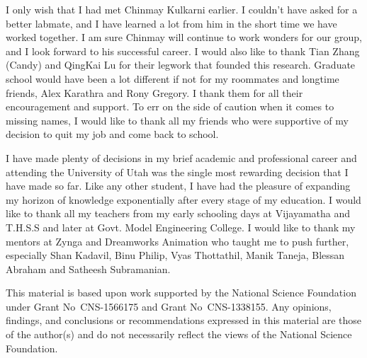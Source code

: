 I only wish that I had met Chinmay Kulkarni earlier. 
I couldn't have asked for a better labmate, and I have learned a lot from him in the short time we have worked together. 
I am sure Chinmay will continue to work wonders for our group, and I look forward to his successful career. 
I would also like to thank Tian Zhang (Candy) and QingKai Lu for their legwork that founded this research. 
Graduate school would have been a lot different if not for my roommates and longtime friends, Alex Karathra and Rony Gregory. 
I thank them for all their encouragement and support. To err on the side of caution when it comes to missing names, I would like to thank all my friends who were supportive of my decision to quit my job and come back to school.

I have made plenty of decisions in my brief academic and professional career and attending the University of Utah was the single most rewarding decision that I have made so far. 
Like any other student, I have had the pleasure of expanding my horizon of knowledge exponentially after every stage of my education. 
I would like to thank all my teachers from my early schooling days at Vijayamatha and T.H.S.S and later at Govt. Model Engineering College. 
I would like to thank my mentors at Zynga and Dreamworks Animation who taught me to push further, especially Shan Kadavil, Binu Philip, Vyas Thottathil, Manik Taneja, Blessan Abraham and Satheesh Subramanian.

This material is based upon work supported by the National Science Foundation \linebreak under Grant No\ CNS-1566175 and Grant No\ CNS-1338155.
Any opinions, findings, and conclusions or recommendations expressed in this material are those of the author(s) and do not necessarily reflect the views of the National Science Foundation.